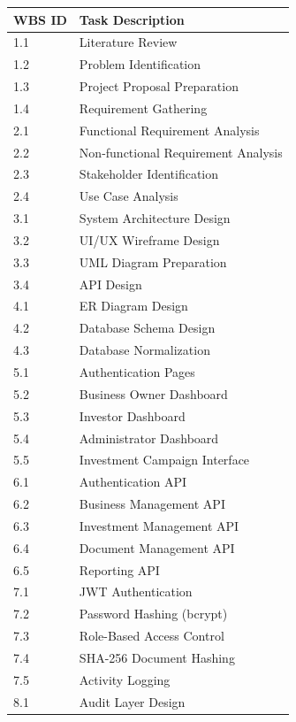\begin{longtable}{|p{2cm}|p{11cm}|}
\hline
\textbf{WBS ID} & \textbf{Task Description} \\
\hline
1.1 & Literature Review \\
\hline
1.2 & Problem Identification \\
\hline
1.3 & Project Proposal Preparation \\
\hline
1.4 & Requirement Gathering \\
\hline
2.1 & Functional Requirement Analysis \\
\hline
2.2 & Non-functional Requirement Analysis \\
\hline
2.3 & Stakeholder Identification \\
\hline
2.4 & Use Case Analysis \\
\hline
3.1 & System Architecture Design \\
\hline
3.2 & UI/UX Wireframe Design \\
\hline
3.3 & UML Diagram Preparation \\
\hline
3.4 & API Design \\
\hline
4.1 & ER Diagram Design \\
\hline
4.2 & Database Schema Design \\
\hline
4.3 & Database Normalization \\
\hline
5.1 & Authentication Pages \\
\hline
5.2 & Business Owner Dashboard \\
\hline
5.3 & Investor Dashboard \\
\hline
5.4 & Administrator Dashboard \\
\hline
5.5 & Investment Campaign Interface \\
\hline
6.1 & Authentication API \\
\hline
6.2 & Business Management API \\
\hline
6.3 & Investment Management API \\
\hline
6.4 & Document Management API \\
\hline
6.5 & Reporting API \\
\hline
7.1 & JWT Authentication \\
\hline
7.2 & Password Hashing (bcrypt) \\
\hline
7.3 & Role-Based Access Control \\
\hline
7.4 & SHA-256 Document Hashing \\
\hline
7.5 & Activity Logging \\
\hline
8.1 & Audit Layer Design \\

\end{longtable}

